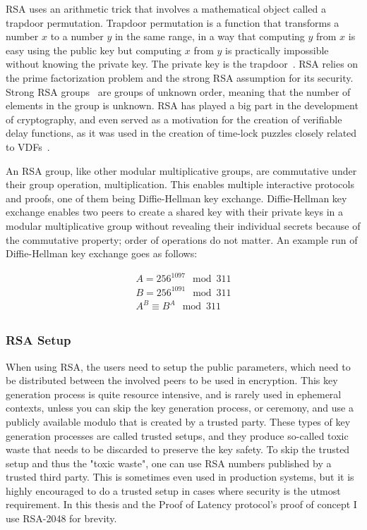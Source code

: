 RSA uses an arithmetic trick that involves a mathematical object called a trapdoor permutation. Trapdoor permutation is a function that transforms a number \(x\) to a number \(y\) in the same range, in a way that computing \(y\) from \(x\) is easy using the public key but computing \(x\) from \(y\) is practically impossible without knowing the private key. The private key is the trapdoor~\cite{Aumasson2018-nh}. RSA relies on the prime factorization problem and the strong RSA assumption for its security. Strong RSA groups~\cite{Rivest2005-kc} are groups of unknown order, meaning that the number of elements in the group is unknown. RSA has played a big part in the development of cryptography, and even served as a motivation for the creation of verifiable delay functions, as it was used in the creation of time-lock puzzles closely related to VDFs~\cite{Boneh2018-sm}.

An RSA group, like other modular multiplicative groups, are commutative under their group operation, multiplication. This enables multiple interactive protocols and proofs, one of them being Diffie-Hellman key exchange. Diffie-Hellman key exchange enables two peers to create a shared key with their private keys in a modular multiplicative group without revealing their individual secrets because of the commutative property; order of operations do not matter. An example run of Diffie-Hellman key exchange goes as follows:

\begin{align*}
	A = 256^{1097} \mod 311\\
  B = 256^{1091} \mod 311\\
	A^B \equiv B^A \mod 311\\
\end{align*}

\subsubsection{RSA Setup}
When using RSA, the users need to setup the public parameters, which need to be distributed between the involved peers to be used in encryption. This key generation process is quite resource intensive, and is rarely used in ephemeral contexts, unless you can skip the key generation process, or ceremony, and use a publicly available modulo that is created by a trusted party. These types of key generation processes are called trusted setups, and they produce so-called toxic waste that needs to be discarded to preserve the key safety. To skip the trusted setup and thus the "toxic waste", one can use RSA numbers published by a trusted third party. This is sometimes even used in production systems, but it is highly encouraged to do a trusted setup in cases where security is the utmost requirement. In this thesis and the Proof of Latency protocol's proof of concept I use RSA-2048 for brevity.

